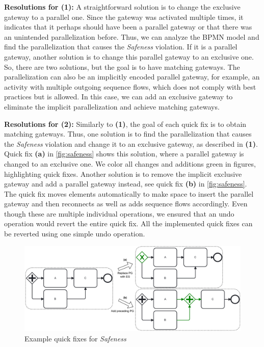 \documentclass[runningheads]{llncs}
\begin{document}
\textbf{Resolutions for (1):} A straightforward solution is to change the exclusive gateway to a parallel one.
Since the gateway was activated multiple times, it indicates that it perhaps should have been a parallel gateway or that there was an unintended parallelization before.
Thus, we can analyze the BPMN model and find the parallelization that causes the \textit{Safeness} violation.
If it is a parallel gateway, another solution is to change this parallel gateway to an exclusive one.
So, there are two solutions, but the goal is to have matching gateways.
The parallelization can also be an implicitly encoded parallel gateway, for example, an activity with multiple outgoing sequence flows, which does not comply with best practices but is allowed.
In this case, we can add an exclusive gateway to eliminate the implicit parallelization and achieve matching gateways.

\textbf{Resolutions for (2):} Similarly to \textbf{(1)}, the goal of each quick fix is to obtain matching gateways.
Thus, one solution is to find the parallelization that causes the \textit{Safeness} violation and change it to an exclusive gateway, as described in \textbf{(1)}.
Quick fix \textbf{(a)} in \autoref{fig:safeness} shows this solution, where a parallel gateway is changed to an exclusive one.
We color all changes and additions green in figures, highlighting quick fixes.
Another solution is to remove the implicit exclusive gateway and add a parallel gateway instead, see quick fix \textbf{(b)} in \autoref{fig:safeness}.
The quick fix moves elements automatically to make space to insert the parallel gateway and then reconnects as well as adds sequence flows accordingly.
Even though these are multiple individual operations, we ensured that an undo operation would revert the entire quick fix.
All the implemented quick fixes can be reverted using one simple undo operation.

\begin{figure}[ht]
	\centering
	\includegraphics[width=1\textwidth]{images/safeness}
	\caption{Example quick fixes for \textit{Safeness}}
	\label{fig:safeness}
\end{figure}
\end{document}
